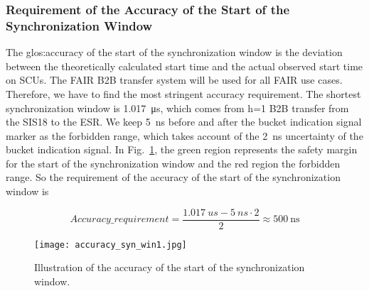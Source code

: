 \subsubsection{Requirement of the Accuracy of the Start of the Synchronization Window}
\label{cal_accuracy}
The \gls{glos:accuracy} of the start of the synchronization window is the deviation between the theoretically calculated start time and the actual observed start time on SCUs. The FAIR B2B transfer system will be used for all FAIR use cases. Therefore, we have to find the most stringent accuracy requirement. The shortest synchronization window is \SI{1.017}{\us}, which comes from h=1 B2B transfer from the SIS18 to the ESR. We keep \SI{5}{ns} before and after the bucket indication signal marker as the forbidden range, which takes account of the \SI{2}{ns} uncertainty of the bucket indication signal. In Fig.~\ref{accuracy_syn_win1}, the green region represents the safety margin for the start of the synchronization window and the red region the forbidden range. So the requirement of the accuracy of the start of the synchronization window is 

\begin{equation}
Accuracy\_requirement=\frac{\SI{1.017}{us}-\SI{5}{ns} \cdot 2}{2} \approx  \SI{500}{\ns}\label{accu}
\end{equation}

\begin{figure}[!htb]
   \centering   
   \texttt{[image: accuracy\_syn\_win1.jpg]}
   \caption{Illustration of the accuracy of the start of the synchronization window.}
   \label{accuracy_syn_win1}
\end{figure}




